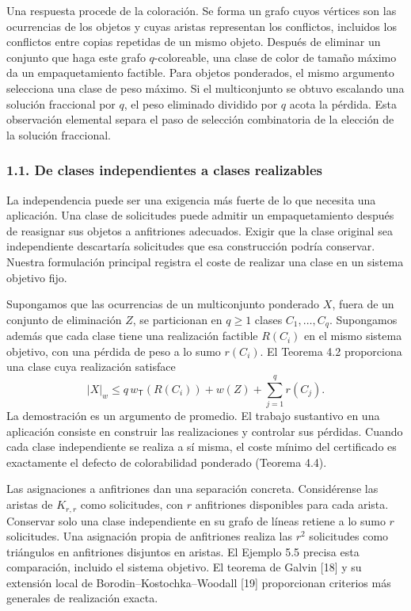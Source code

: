 \documentclass[spanish,11pt,a4paper]{article}
\begin{document}
Una respuesta procede de la coloración. Se forma un grafo cuyos vértices
son las ocurrencias de los objetos y cuyas aristas representan los
conflictos, incluidos los conflictos entre copias repetidas de un mismo
objeto. Después de eliminar un conjunto que haga este grafo
\(q\)-coloreable, una clase de color de tamaño máximo da un
empaquetamiento factible. Para objetos ponderados, el mismo argumento
selecciona una clase de peso máximo. Si el multiconjunto se obtuvo
escalando una solución fraccional por \(q\), el peso eliminado dividido
por \(q\) acota la pérdida. Esta observación elemental separa el paso de
selección combinatoria de la elección de la solución fraccional.

\subsubsection{1.1. De clases independientes a clases
realizables}\label{de-clases-independientes-a-clases-realizables}

La independencia puede ser una exigencia más fuerte de lo que necesita
una aplicación. Una clase de solicitudes puede admitir un
empaquetamiento después de reasignar sus objetos a anfitriones
adecuados. Exigir que la clase original sea independiente descartaría
solicitudes que esa construcción podría conservar. Nuestra formulación
principal registra el coste de realizar una clase en un sistema objetivo
fijo.

Supongamos que las ocurrencias de un multiconjunto ponderado \(X\),
fuera de un conjunto de eliminación \(Z\), se particionan en \(q\ge1\)
clases \(C_1,\ldots,C_q\). Supongamos además que cada clase tiene una
realización factible \(R(C_i)\) en el mismo sistema objetivo, con una
pérdida de peso a lo sumo \(r(C_i)\). El Teorema 4.2 proporciona una
clase cuya realización satisface \[
|X|_w\le q\,w_{\mathsf T}(R(C_i))+w(Z)+\sum_{j=1}^q r(C_j).
\] La demostración es un argumento de promedio. El trabajo sustantivo en
una aplicación consiste en construir las realizaciones y controlar sus
pérdidas. Cuando cada clase independiente se realiza a sí misma, el
coste mínimo del certificado es exactamente el defecto de colorabilidad
ponderado (Teorema 4.4).

Las asignaciones a anfitriones dan una separación concreta. Considérense
las aristas de \(K_{r,r}\) como solicitudes, con \(r\) anfitriones
disponibles para cada arista. Conservar solo una clase independiente en
su grafo de líneas retiene a lo sumo \(r\) solicitudes. Una asignación
propia de anfitriones realiza las \(r^2\) solicitudes como triángulos en
anfitriones disjuntos en aristas. El Ejemplo 5.5 precisa esta
comparación, incluido el sistema objetivo. El teorema de Galvin {[}18{]}
y su extensión local de Borodin--Kostochka--Woodall {[}19{]}
proporcionan criterios más generales de realización exacta.
\end{document}
